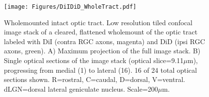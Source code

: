 \begin{figure}[hbtp]
    \begin{center}
        \texttt{[image: Figures/DiIDiD\_WholeTract.pdf]}
        \caption[Wholemounted intact optic tract.]
        {Wholemounted intact optic tract.
        Low resolution tiled confocal image stack of a cleared, flattened wholemount of the optic tract labeled with DiI (contra RGC axons, magenta) and DiD (ipsi RGC axons, green).
        A) Maximum projection of the full image stack.
        B) Single optical sections of the image stack (optical slice=9.11$\mu$m), progressing from medial (1) to lateral (16).
        16 of 24 total optical sections shown.
        R=rostral, C=caudal, D=dorsal, V=ventral.
        dLGN=dorsal lateral geniculate nucleus.
        Scale=200$\mu$m.
        }
        \label{Figures/DiIDiDWholeTract}
    \end{center}
\end{figure}

